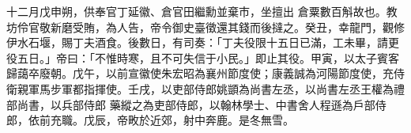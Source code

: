 \begin{pinyinscope}
 十二月戊申朔，供奉官丁延徽、倉官田繼勳並棄市，坐擅出
 倉粟數百斛故也。教坊伶官敬新磨受賄，為人告，帝令御史臺徵還其錢而後撻之。癸丑，幸龍門，觀修伊水石堰，賜丁夫酒食。後數日，有司奏：「丁夫役限十五日已滿，工未畢，請更役五日。」帝曰：「不惟時寒，且不可失信于小民。」即止其役。甲寅，以太子賓客歸藹卒廢朝。戊午，以前宣徽使朱宏昭為襄州節度使；康義誠為河陽節度使，充侍衛親軍馬步軍都指揮使。壬戌，以吏部侍郎姚顗為尚書左丞，以尚書左丞王權為禮部尚書，以兵部侍郎
 藥縱之為吏部侍郎，以翰林學士、中書舍人程遜為戶部侍郎，依前充職。戊辰，帝畋於近郊，射中奔鹿。是冬無雪。



\end{pinyinscope}